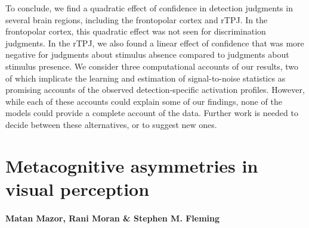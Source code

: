 \documentclass[12pt,twoside]{reedthesis}
\begin{document}
To conclude, we find a quadratic effect of confidence in detection judgments in several brain regions, including the frontopolar cortex and rTPJ. In the frontopolar cortex, this quadratic effect was not seen for discrimination judgments. In the rTPJ, we also found a linear effect of confidence that was more negative for judgments about stimulus absence compared to judgments about stimulus presence. We consider three computational accounts of our results, two of which implicate the learning and estimation of signal-to-noise statistics as promising accounts of the observed detection-specific activation profiles. However, while each of these accounts could explain some of our findings, none of the models could provide a complete account of the data. Further work is needed to decide between these alternatives, or to suggest new ones.

\hypertarget{ch-asymmetry}{%
\chapter{Metacognitive asymmetries in visual perception}\label{ch-asymmetry}}

\hypertarget{matan-mazor-rani-moran-stephen-m.-fleming}{%
\subsubsection*{Matan Mazor, Rani Moran \& Stephen M. Fleming}\label{matan-mazor-rani-moran-stephen-m.-fleming}}
\end{document}

